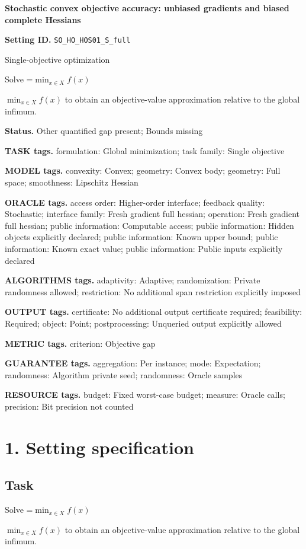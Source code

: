 \documentclass[10pt,a4paper]{article}
\newcommand{\AtlasMath}[1]{\par\begingroup\centering\setbox0=\hbox{$\displaystyle #1$}\ifdim\wd0>1.4\linewidth\typeout{ATLAS WIDE FORMULA: \the\wd0}\fi\ifdim\wd0>\linewidth\resizebox{\linewidth}{!}{\box0}\else\box0\fi\par\endgroup}
\newcommand{\AtlasInlineMath}[1]{\begingroup\setbox0=\hbox{$#1$}\ifdim\wd0>.4\linewidth\endgroup\AtlasMath{#1}\else\endgroup$#1$\fi}
\begin{document}
\raggedright

{\LARGE\bfseries\sffamily\color{AtlasNavy} Stochastic convex objective accuracy: unbiased gradients and biased complete Hessians\par}\vspace{5pt}
\textbf{Setting ID.} \texttt{SO\_\allowbreak{}HO\_\allowbreak{}HOS01\_\allowbreak{}S\_\allowbreak{}full}

Single-objective optimization

Solve \AtlasInlineMath{\min_{x\in X}f(x)} to obtain an objective-value approximation relative to the global infimum.

\textbf{Status.} Other quantified gap present; Bounds missing

\textbf{TASK tags.} formulation: Global minimization; task family: Single objective

\textbf{MODEL tags.} convexity: Convex; geometry: Convex body; geometry: Full space; smoothness: Lipschitz Hessian

\textbf{ORACLE tags.} access order: Higher-order interface; feedback quality: Stochastic; interface family: Fresh gradient full hessian; operation: Fresh gradient full hessian; public information: Computable access; public information: Hidden objects explicitly declared; public information: Known upper bound; public information: Known exact value; public information: Public inputs explicitly declared

\textbf{ALGORITHMS tags.} adaptivity: Adaptive; randomization: Private randomness allowed; restriction: No additional span restriction explicitly imposed

\textbf{OUTPUT tags.} certificate: No additional output certificate required; feasibility: Required; object: Point; postprocessing: Unqueried output explicitly allowed

\textbf{METRIC tags.} criterion: Objective gap

\textbf{GUARANTEE tags.} aggregation: Per instance; mode: Expectation; randomness: Algorithm private seed; randomness: Oracle samples

\textbf{RESOURCE tags.} budget: Fixed worst-case budget; measure: Oracle calls; precision: Bit precision not counted

\section{1. Setting specification}
\subsection{Task}
Solve \AtlasInlineMath{\min_{x\in X}f(x)} to obtain an objective-value approximation relative to the global infimum.
\end{document}
